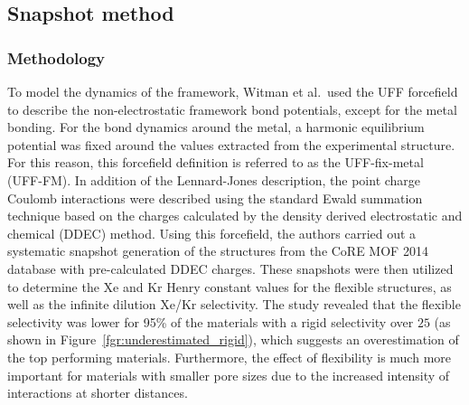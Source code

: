 \documentclass[main]{subfiles}
\begin{document}
\subsection{Snapshot method}

\subsubsection{Methodology}

To model the dynamics of the framework, Witman et al.\ used the UFF forcefield to describe the non-electrostatic framework bond potentials, except for the metal bonding. For the bond dynamics around the metal, a harmonic equilibrium potential was fixed around the values extracted from the experimental structure. For this reason, this forcefield definition is referred to as the UFF-fix-metal (UFF-FM). In addition of the Lennard-Jones description, the point charge Coulomb interactions were described using the standard Ewald summation technique based on the charges calculated by the density derived electrostatic and chemical (DDEC) method.\autocite{manz2010chemically} Using this forcefield, the authors carried out a systematic snapshot generation of the structures from the CoRE MOF 2014 database with pre-calculated DDEC charges. These snapshots were then utilized to determine the Xe and Kr Henry constant values for the flexible structures, as well as the infinite dilution Xe/Kr selectivity. The study revealed that the flexible selectivity was lower for {95\%} of the materials with a rigid selectivity over $25$ (as shown in Figure~\ref{fgr:underestimated_rigid}), which suggests an overestimation of the top performing materials. Furthermore, the effect of flexibility is much more important for materials with smaller pore sizes due to the increased intensity of interactions at shorter distances.
\end{document}
